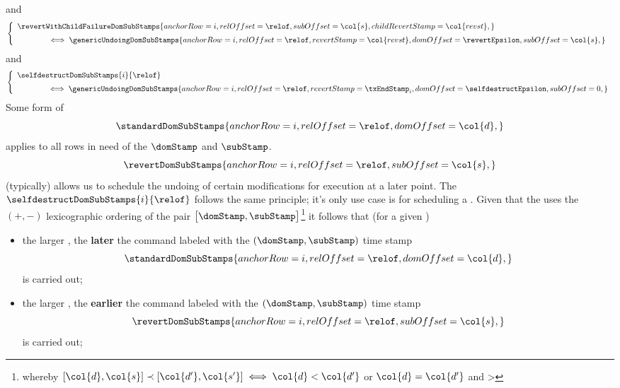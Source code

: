 and
\[
	\left\{ \begin{array}{l}
		\revertWithChildFailureDomSubStamps {
			anchorRow        = i           ,
			relOffset        = \relof      ,
			subOffset        = \col{s}     ,
			childRevertStamp = \col{revst} ,
		}
		\vspace{2mm} \\ \qquad \qquad \iff
		\genericUndoingDomSubStamps {
			anchorRow   = i              ,
			relOffset   = \relof         ,
			revertStamp = \col{revst}    ,
			domOffset   = \revertEpsilon ,
			subOffset   = \col{s}        ,
		}
	\end{array} \right.
\]
and
\[
	\left\{ \begin{array}{l}
		\selfdestructDomSubStamps {i}{\relof}
		\vspace{2mm} \\ \qquad \qquad \iff
		\genericUndoingDomSubStamps {
			anchorRow   = i                    ,
			relOffset   = \relof               ,
			revertStamp = \txEndStamp_{i}      ,
			domOffset   = \selfdestructEpsilon ,
			subOffset   = 0                    ,
		}
	\end{array} \right.
\]
Some form of 
\[ 
	\standardDomSubStamps {
		anchorRow = i       ,
		relOffset = \relof  ,
		domOffset = \col{d} ,
		}
\]
applies to all rows in need of the $\domStamp$ and $\subStamp$.
\[ 
\revertDomSubStamps {
	anchorRow = i       ,
	relOffset = \relof  ,
	subOffset = \col{s} ,
	}
\]
(typically) allows us to schedule the undoing of certain modifications for execution at a later point.
The $\selfdestructDomSubStamps{i}{\relof}$ follows the same principle; it's only use case is for scheduling a . \saNote{} Given that the \zkEvm{} uses the $(+,-)$ lexicographic ordering of the pair $\big[\domStamp, \subStamp\big]$\footnote{whereby $[\col{d}, \col{s}] \prec [\col{d'}, \col{s'}] \iff \col{d} < \col{d'}$ or $\col{d} = \col{d'}$ and  > } it follows that (for a given \hubStamp)
\begin{itemize}
	\item the larger , the \textbf{later} the command labeled with the $(\domStamp, \subStamp)$ time stamp
		\[ 
			\standardDomSubStamps {
				anchorRow = i       ,
				relOffset = \relof  ,
				domOffset = \col{d} ,
			}
		\]
		is carried out;
	\item the larger , the \textbf{earlier} the command labeled with the $(\domStamp, \subStamp)$ time stamp
		\[ 
		\revertDomSubStamps {
			anchorRow = i       ,
			relOffset = \relof  ,
			subOffset = \col{s} ,
		}
		\]
		is carried out;
\end{itemize}

